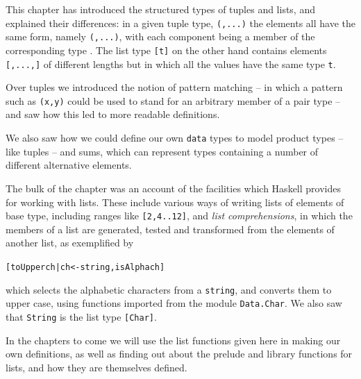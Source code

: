 \begin{summary}
This chapter has introduced the structured types of tuples and lists,
and explained their differences: in a given tuple type, 
\texttt{(\tone,...\tn)}
the elements all have the same form, namely \texttt{(\vone,...\vn)},
with each component \texttt{} being a member of the corresponding
type \texttt{}. The list type \texttt{[t]} on the other hand contains
elements \texttt{[\eone,...,]} of different lengths but in which 
all the values \texttt{} have the same
type \texttt{t}.

Over tuples we introduced the notion of pattern matching -- in which a
pattern such as \texttt{(x,y)}
could be used to stand for an arbitrary member of a pair type -- and saw
how this led to more readable definitions.

We also saw how we could define our own \texttt{data} types to model product types -- like tuples -- and sums, which can represent types containing a number of different alternative elements.

The bulk of the chapter was an account of the facilities which
Haskell provides for working with lists. These include
various ways of writing lists of elements of base type, including ranges
like \texttt{[2,4..12]}, and \emph{list comprehensions}, in which the members of a list are
generated, tested and transformed from the elements of another list, as
exemplified by
\begin{alltt}
[ toUpper ch | ch <- string , isAlpha ch ]
\end{alltt}
which selects the alphabetic characters from a \texttt{string}, and
converts them to upper case, using functions imported from the module \texttt{Data.Char}. We also saw that \texttt{String} is the list type \texttt{[Char]}.

In the chapters to come we will use the list functions given here in making
our own definitions, as well as finding out about the prelude and library functions for lists, and how they are
themselves defined.
\end{summary}
%
